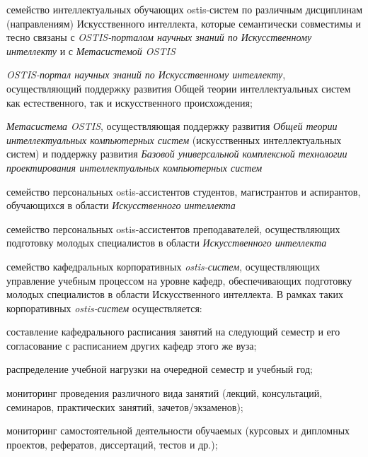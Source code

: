 \begin{scnsubstruct}
\begin{scnindent}
\begin{scnindent}
{\begin{scnitemize}
		            \item семейство интеллектуальных обучающих ostis-систем по различным дисциплинам (направлениям) Искусственного интеллекта, которые семантически совместимы и тесно связаны с \textit{OSTIS-порталом научных знаний по Искусственному интеллекту} и с \textit{Метасистемой OSTIS}
		            \item \textit{OSTIS-портал научных знаний по Искусственному интеллекту}, осуществляющий поддержку развития Общей теории интеллектуальных систем как естественного, так и искусственного происхождения;
		            \item \textit{Метасистема OSTIS}, осуществляющая поддержку развития \textit{Общей теории интеллектуальных компьютерных систем} (искусственных интеллектуальных систем) и поддержку развития \textit{Базовой универсальной комплексной технологии проектирования интеллектуальных компьютерных систем}
		            \item семейство персональных ostis-ассистентов студентов, магистрантов и аспирантов, обучающихся в области \textit{Искусственного интеллекта}
		            \item семейство персональных ostis-ассистентов преподавателей, осуществляющих подготовку молодых специалистов в области \textit{Искусственного интеллекта}
		            \item семейство кафедральных корпоративных \textit{ostis-систем}, осуществляющих управление учебным процессом на уровне кафедр, обеспечивающих подготовку молодых специалистов в области Искусственного интеллекта. В рамках таких корпоративных \textit{ostis-систем} осуществляется:
		            \begin{scnitemizeii}
		                \item составление кафедрального расписания занятий на следующий семестр и его согласование с расписанием других кафедр этого же вуза;
		                \item распределение учебной нагрузки на очередной семестр и учебный год;
		                \item мониторинг проведения различного вида занятий (лекций, консультаций, семинаров, практических занятий, зачетов/экзаменов);
		                \item мониторинг самостоятельной деятельности обучаемых (курсовых и дипломных проектов, рефератов, диссертаций, тестов и др.);

\end{scnitemizeii}
\end{scnitemize}}
\end{scnindent}
\end{scnindent}
\end{scnsubstruct}
